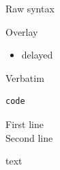 \documentclass[aspectratio=169]{beamer}
\begin{document}
\begin{frame}{Raw syntax}
\end{frame}

\begin{frame}{Overlay}
\begin{itemize}
\item<2> delayed
\end{itemize}
\end{frame}

\begin{frame}{Verbatim}
\begin{verbatim}
code
\end{verbatim}
\end{frame}

\begin{frame}[label=canvas]{First line\\Second line}
\begin{deckcanvas}
\pause
\begin{decktext}[x=0.8,y=0,w=0.4,size=huge]
text
\end{decktext}
\end{deckcanvas}
\end{frame}
\end{document}
